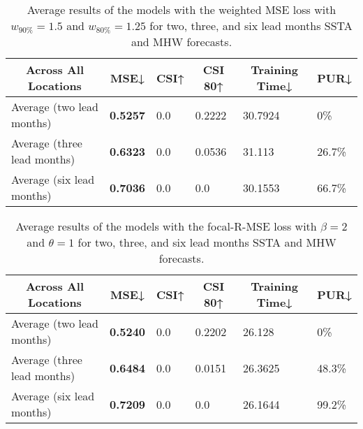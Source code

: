 \documentclass[11pt, a4paper]{article}
\begin{document}
\begin{table}[H]
\centering
\scriptsize
\caption{Average results of the models with the weighted MSE loss with $w_{90\%}=1.5$ and $w_{80\%}=1.25$ for two, three, and six lead months SSTA and MHW forecasts.}\label{tb:wmseall}
\begin{tabular}{llllll}
\multicolumn{1}{c}{\textbf{Across All Locations}} & \multicolumn{1}{c}{\textbf{MSE↓}} & \multicolumn{1}{c}{\textbf{CSI↑}} & \multicolumn{1}{c}{\textbf{CSI 80↑}} & \multicolumn{1}{c}{\textbf{Training Time↓}} & \multicolumn{1}{c}{\textbf{PUR↓}} \\ \hline
Average (two lead months)                         & \textbf{0.5257}                   & 0.0                               & 0.2222                               & 30.7924                                     & 0\%                               \\
Average (three lead months)                       & \textbf{0.6323}                   & 0.0                               & 0.0536                               & 31.113                                      & 26.7\%                            \\
Average (six lead months)                         & \textbf{0.7036}                   & 0.0                               & 0.0                                  & 30.1553                                     & 66.7\%
\end{tabular}
\end{table}

\begin{table}[H]
\centering
\scriptsize
\caption{Average results of the models with the focal-R-MSE loss with $\beta=2$ and $\theta=1$ for two, three, and six lead months SSTA and MHW forecasts.}\label{tb:focalall}
\begin{tabular}{llllll}
\multicolumn{1}{c}{\textbf{Across All Locations}} & \multicolumn{1}{c}{\textbf{MSE↓}} & \multicolumn{1}{c}{\textbf{CSI↑}} & \multicolumn{1}{c}{\textbf{CSI 80↑}} & \multicolumn{1}{c}{\textbf{Training Time↓}} & \multicolumn{1}{c}{\textbf{PUR↓}} \\ \hline
Average (two lead months)                         & \textbf{0.5240}                   & 0.0                               & 0.2202                               & 26.128                                      & 0\%                               \\
Average (three lead months)                       & \textbf{0.6484}                   & 0.0                               & 0.0151                               & 26.3625                                     & 48.3\%                            \\
Average (six lead months)                         & \textbf{0.7209}                   & 0.0                               & 0.0                                  & 26.1644                                     & 99.2\%
\end{tabular}
\end{table}
\end{document}
